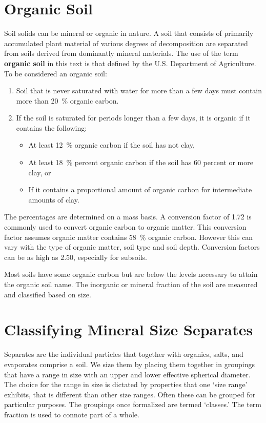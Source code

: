 \documentclass{book}
\begin{document}
\section{Organic Soil}
\label{organic_soil}
    
Soil solids can be mineral or organic in nature. A soil that consists of primarily accumulated plant material of various degrees of decomposition are separated from soils derived from dominantly mineral materials. The use of the term \textbf{organic soil} in this text is that defined by the U.S. Department of Agriculture. To be considered an organic soil:
    
\begin{enumerate}
    \item Soil that is never saturated with water for more than a few days must contain more than \qty{20}{\percent} organic carbon.
    \item If the soil is saturated for periods longer than a few days, it is organic if it contains the following:
    \begin{itemize}
        \item At least \qty{12}{\percent} organic carbon if the soil has not clay,
        \item At least \qty{18}{\percent} percent organic carbon if the soil has 60 percent or more clay, or
        \item If it contains a proportional amount of organic carbon for intermediate amounts of clay.
    \end{itemize}
\end{enumerate}
    
The percentages are determined on a mass basis. A conversion factor of \num{1.72} is commonly used to convert organic carbon to organic matter. This conversion factor assumes organic matter contains \qty{58}{\percent} organic carbon. However this can vary with the type of organic matter, soil type and soil depth. Conversion factors can be as high as \num{2.50}, especially for subsoils.
    
Most soils have some organic carbon but are below the levels necessary to attain the organic soil name. The inorganic or mineral fraction of the soil are measured and classified based on size.
    
\section{Classifying Mineral Size Separates}
    
Separates are the individual particles that together with organics, salts, and evaporates comprise a soil. We size them by placing them together in groupings that have a range in size with an upper and lower effective spherical diameter. The choice for the range in size is dictated by properties that one ‘size range’ exhibits, that is different than other size ranges. Often these can be grouped for particular purposes. The groupings once formalized are termed ‘classes.’ The term fraction is used to connote part of a whole.
    
\end{document}
